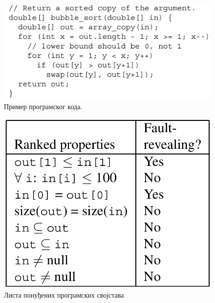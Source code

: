 \documentclass[a4paper]{article}
\begin{document}
{\begin{figure}[h!]
\begin{center}
\includegraphics[scale=0.16]{./slike/latent_code.png}
\end{center}
    \caption{Пример програмског кода.}
\label{fig:latent_code}
\end{figure}

\begin{figure}[h!]
\begin{center}
\includegraphics[scale=0.16]{./slike/latent_examples.png}
\end{center}
    \caption{Листа понуђених програмских својстава}
\label{fig:latent_example}
\end{figure}

}
\end{document}
